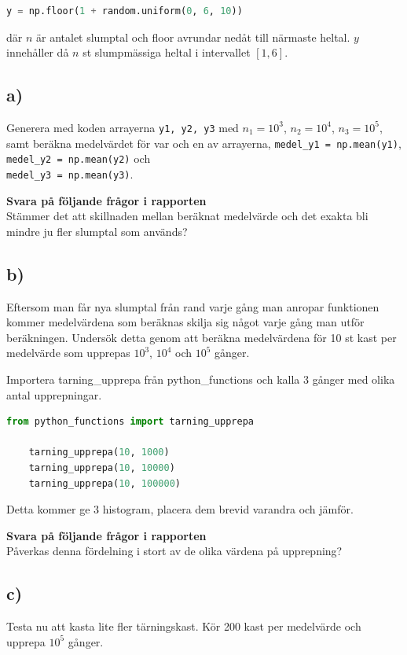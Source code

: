 \documentclass[a4paper]{article}
\begin{document}
\begin{lstlisting}[language=Python]
    y = np.floor(1 + random.uniform(0, 6, 10))
\end{lstlisting}

där \( n \)  är antalet slumptal och floor avrundar nedåt till närmaste heltal. \( y  \)
innehåller då \( n \)  st slumpmässiga heltal i intervallet $[1,6]$.

\subsection{a)}
Generera med koden arrayerna \lstinline{y1, y2, y3} med \( n_1=10^3 \), \( n_2=10^4 \), \( n_3=10^5 \),
samt beräkna medelvärdet för var och en av arrayerna, \lstinline{medel_y1 = np.mean(y1)},
\lstinline{medel_y2 = np.mean(y2)} och \\ \lstinline{medel_y3 = np.mean(y3)}.

\textbf{Svara på följande frågor i rapporten}\\
Stämmer det att skillnaden mellan beräknat medelvärde och det exakta bli mindre ju fler slumptal som används?

\subsection{b)}
\label{sec:2b}
Eftersom man får nya slumptal från rand varje gång man anropar funktionen kommer medelvärdena som 
beräknas skilja sig något varje gång man utför beräkningen. 
Undersök detta genom att beräkna medelvärdena för 10 st kast per medelvärde som upprepas \( 10^3 \),
\( 10^4 \) och \( 10^5 \) gånger.

Importera tarning\_upprepa från python\_functions och kalla 3 gånger med olika antal upprepningar.
\begin{lstlisting}[language=Python]
    from python_functions import tarning_upprepa

    tarning_upprepa(10, 1000)
    tarning_upprepa(10, 10000)
    tarning_upprepa(10, 100000)
\end{lstlisting}
Detta kommer ge 3 histogram, placera dem brevid varandra och jämför. 

\textbf{Svara på följande frågor i rapporten}\\
Påverkas denna fördelning i stort av de olika värdena på upprepning?

\subsection{c)}
Testa nu att kasta lite fler tärningskast. Kör 200 kast per medelvärde och upprepa \( 10^5 \) gånger.
\end{document}

